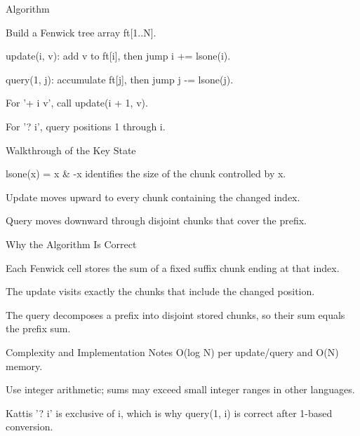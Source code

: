 \documentclass[aspectratio=169,11pt]{beamer}
\begin{document}
\begin{frame}{Algorithm}
\begin{tightitemize}
  \item Build a Fenwick tree array ft[1..N].
  \item update(i, v): add v to ft[i], then jump i += lsone(i).
  \item query(1, j): accumulate ft[j], then jump j -= lsone(j).
  \item For '+ i v', call update(i + 1, v).
  \item For '? i', query positions 1 through i.
\end{tightitemize}
\end{frame}

\begin{frame}{Walkthrough of the Key State}
\begin{tightitemize}
  \item lsone(x) = x \& -x identifies the size of the chunk controlled by x.
  \item Update moves upward to every chunk containing the changed index.
  \item Query moves downward through disjoint chunks that cover the prefix.
\end{tightitemize}
\end{frame}

\begin{frame}{Why the Algorithm Is Correct}
\begin{tightitemize}
  \item Each Fenwick cell stores the sum of a fixed suffix chunk ending at that index.
  \item The update visits exactly the chunks that include the changed position.
  \item The query decomposes a prefix into disjoint stored chunks, so their sum equals the prefix sum.
\end{tightitemize}
\end{frame}

\begin{frame}{Complexity and Implementation Notes}
\small
{} O(log N) per update/query and O(N) memory.

\vspace{0.3cm}
\begin{tightitemize}
  \item Use integer arithmetic; sums may exceed small integer ranges in other languages.
  \item Kattis '? i' is exclusive of i, which is why query(1, i) is correct after 1-based conversion.
\end{tightitemize}
\end{frame}
\end{document}
